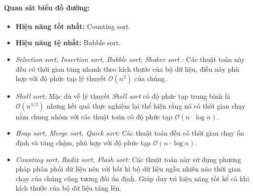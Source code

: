     \paragraph{Quan sát biểu đồ đường:}
    \begin{itemize}
        \item \textbf{Hiệu năng tốt nhất:} Counting sort.
        \item \textbf{Hiệu năng tệ nhất:} Bubble sort.
        \item \textit{Selection sort, Insertion sort, Bubble sort, Shaker sort :} Các thuật toán này đều có thời gian tăng nhanh theo kích thước của bộ dữ liệu, điều này phù hợp với độ phức tạp lý thuyết $\mathcal{O}(n^2)$ của chúng.
        \item \textit{Shell sort:} Mặc dù về lý thuyết \textit{Shell sort} có độ phức tạp trung bình là $\mathcal{O}(n^{3/2})$ nhưng kết quả thực nghiệm lại thể hiện rằng nó có thời gian chạy nằm chung nhóm với các thuật toán có độ phức tạp $\mathcal{O}(n \cdot \log n)$. 
        \item \textit{Heap sort, Merge sort, Quick sort:} Các thuật toán đều có thời gian chạy ổn định và tăng chậm, phù hợp với độ phức tạp $\mathcal{O}(n \cdot \log n)$.
        \item \textit{Counting sort, Radix sort, Flash sort:} Các thuật toán này sử dụng phương pháp phân phối dữ liệu nên với bất kì bộ dữ liệu ngẫu nhiên nào thời gian chạy của chúng cũng tương đối ổn định. Giúp duy trì hiệu năng tốt kể cả khi kích thước của bộ dữ liệu tăng lên.
    \end{itemize}
\newpage
